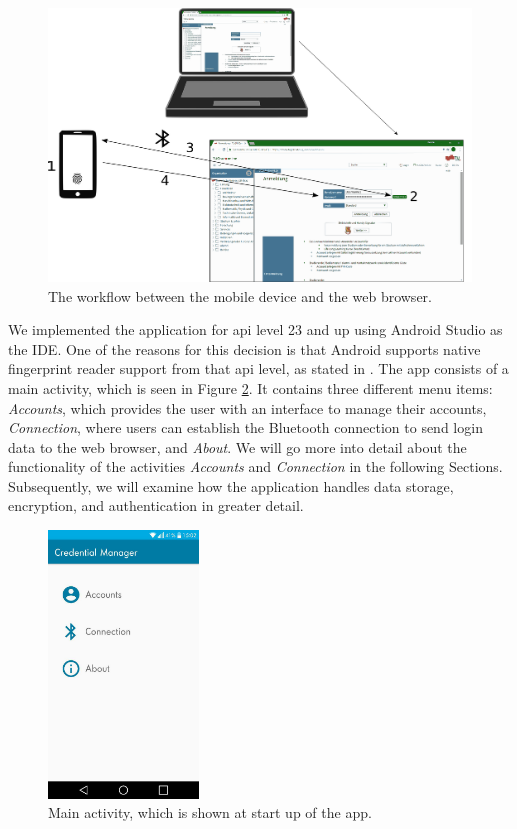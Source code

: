 \vspace{0.3cm}
\begin{figure}[!htb]
    \centering
    \includegraphics[width=14cm]{images/Communication.png}
    \caption[Workflow between Devices]{The workflow between the mobile device and the web browser.}
    \label{fig:comm}
\end{figure}
\vspace{0.3cm}



\noindent We implemented the application for \gls{api} level 23 and up using Android Studio as the IDE. One of the reasons for this decision is that Android supports native fingerprint reader support from that \gls{api} level, as stated in \cite{AndroidM}. The app consists of a main activity, which is seen in Figure \ref{fig:mainactivity}. It contains three different menu items: \textit{Accounts}, which provides the user with an interface to manage their accounts, \textit{Connection}, where users can establish the Bluetooth connection to send login data to the web browser, and \textit{About}. We will go more into detail about the functionality of the activities \textit{Accounts} and \textit{Connection} in the following Sections. Subsequently, we will examine how the application handles data storage, encryption, and authentication in greater detail.

\begin{figure}[!htb]
\centering
\includegraphics[width=4cm]{images/MainActivityNew}
\caption[Main Activity]{Main activity, which is shown at start up of the app.}
\label{fig:mainactivity}
\end{figure}

